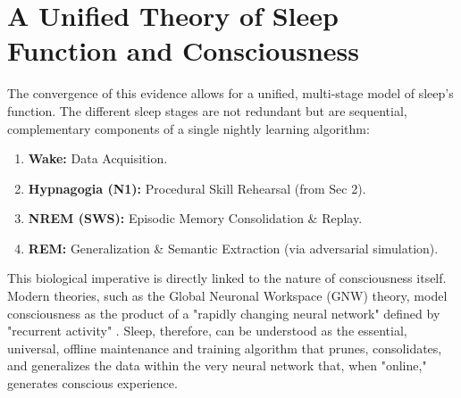 \section{A Unified Theory of Sleep Function and Consciousness}\label{sec:unified_theory}

The convergence of this evidence allows for a unified, multi-stage model of sleep's function. The different sleep stages are not redundant but are sequential, complementary components of a single nightly learning algorithm:
\begin{enumerate}
    \item \textbf{Wake:} Data Acquisition.
    \item \textbf{Hypnagogia (N1):} Procedural Skill Rehearsal (from Sec 2).
    \item \textbf{NREM (SWS):} Episodic Memory Consolidation \& Replay.
    \item \textbf{REM:} Generalization \& Semantic Extraction (via adversarial simulation).
\end{enumerate}

This biological imperative is directly linked to the nature of consciousness itself. Modern theories, such as the Global Neuronal Workspace (GNW) theory, model consciousness as the product of a "rapidly changing neural network" defined by "recurrent activity" \citep{dehaene1998gnw}. Sleep, therefore, can be understood as the essential, universal, offline maintenance and training algorithm that prunes, consolidates, and generalizes the data within the very neural network that, when "online," generates conscious experience.
